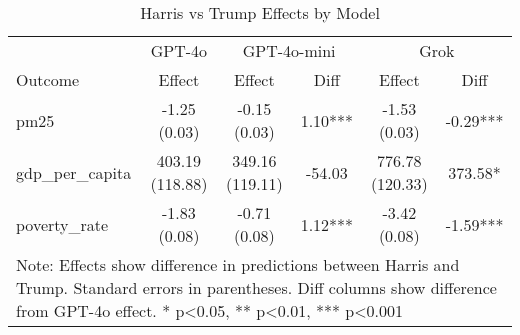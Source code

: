 \begin{table}[htbp]
    \centering
    \caption{Harris vs Trump Effects by Model}
    \begin{tabular}{lccccc}
    \hline
    & \multicolumn{1}{c}{GPT-4o} & \multicolumn{2}{c}{GPT-4o-mini} & \multicolumn{2}{c}{Grok} \\
    Outcome & Effect & Effect & Diff & Effect & Diff \\
    \hline
    pm25 & -1.25 (0.03) & -0.15 (0.03) & 1.10*** & -1.53 (0.03) & -0.29*** \\
gdp_per_capita & 403.19 (118.88) & 349.16 (119.11) & -54.03 & 776.78 (120.33) & 373.58* \\
poverty_rate & -1.83 (0.08) & -0.71 (0.08) & 1.12*** & -3.42 (0.08) & -1.59*** \\
\hline
    \multicolumn{6}{p{0.95\textwidth}}{\small Note: Effects show difference in predictions between Harris and Trump. 
    Standard errors in parentheses. Diff columns show difference from GPT-4o effect. * p<0.05, ** p<0.01, *** p<0.001} \\
    \end{tabular}
    \label{tab:model_comparison}
    \end{table}